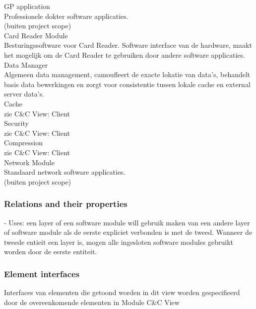 \documentclass[a4paper,10pt]{article}
\begin{document}
GP application\\
Professionele dokter software applicaties.\\
(buiten project scope)\\

Card Reader Module\\
Besturingssoftware voor Card Reader. Software interface van de hardware, maakt het mogelijk om de Card Reader te gebruiken door andere software applicaties.\\

Data Manager\\
Algemeen data management, camoufleert de exacte lokatie van data's, behandelt basis data bewerkingen en zorgt voor consistentie tussen lokale cache en external server data's.\\

Cache\\
zie C\&C View: Client\\

Security\\
zie C\&C View: Client\\

Compression\\
zie C\&C View: Client\\

Network Module\\
Standaard network software applicaties.\\
(buiten project scope)\\


\subsubsection{Relations and their properties}

- Uses: een layer of een software module will gebruik maken van een andere layer of software module als de eerste expliciet verbonden is met de tweed. Wanneer de tweede entieit een layer is, mogen alle ingesloten software modules gebruikt worden door de eerste entiteit.\\

\subsubsection{Element interfaces}

Interfaces van elementen die getoond worden in dit view worden gespecifieerd door de overeenkomende elementen in Module C\&C View\\
\end{document}
